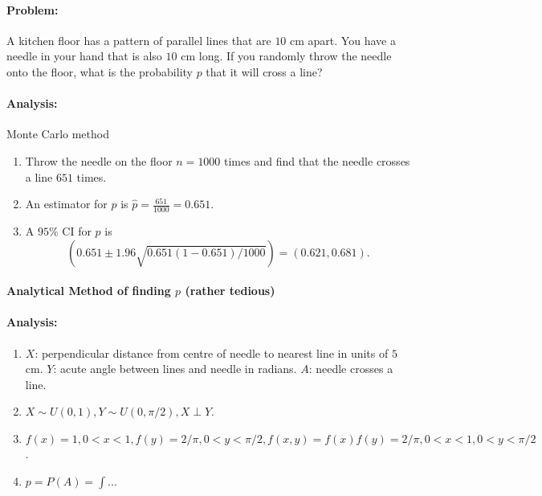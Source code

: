 \documentclass[a4paper, 11pt, twoside]{article}
\begin{document}
\paragraph{Problem:} A kitchen floor has a pattern of parallel lines that are $10$ cm apart. You have a needle in your hand that is also $10$ cm long. If you randomly throw the needle onto the floor, what is the probability $p$ that it will cross a line?

\paragraph{Analysis:} Monte Carlo method

\begin{enumerate}
	\item Throw the needle on the floor $n=1000$ times and find that the needle crosses a line $651$ times.
	\item An estimator for $p$ is $\hat{p}=\frac{651}{1000}=0.651$.
	\item A $95\%$ CI for $p$ is
	\[\left(0.651\pm 1.96\sqrt{0.651(1-0.651)/1000}\right) = (0.621, 0.681).\]
\end{enumerate}

\paragraph{Analytical Method of finding $p$ (rather tedious)}

\paragraph{Analysis:}

\begin{enumerate}
	\item $X$: perpendicular distance from centre of needle to nearest line in units of $5$ cm. $Y$: acute angle between lines and needle in radians. $A$: needle crosses a line.
	\item $X\sim U(0,1), Y\sim U(0, \pi /2), X\perp Y$.
	\item $f(x)=1, 0< x< 1, f(y)=2/\pi, 0 < y <\pi/2, f(x,y)=f(x)f(y)=2/\pi, 0 < x<1, 0<y<\pi/2$.
	\item $p=P(A)=\int ...$
\end{enumerate}
\end{document}
